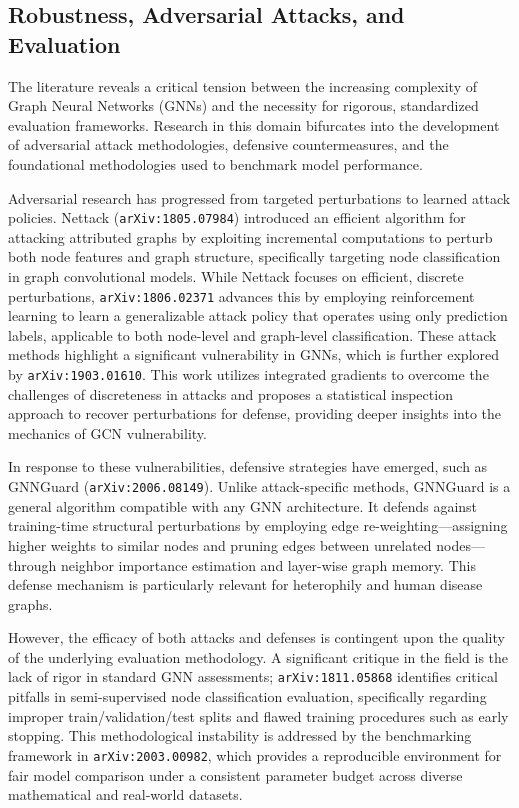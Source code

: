 \documentclass[11pt]{article}
\begin{document}
\subsection{Robustness, Adversarial Attacks, and Evaluation}

The literature reveals a critical tension between the increasing complexity of Graph Neural Networks (GNNs) and the necessity for rigorous, standardized evaluation frameworks. Research in this domain bifurcates into the development of adversarial attack methodologies, defensive countermeasures, and the foundational methodologies used to benchmark model performance.

Adversarial research has progressed from targeted perturbations to learned attack policies. Nettack (\texttt{arXiv:1805.07984}) introduced an efficient algorithm for attacking attributed graphs by exploiting incremental computations to perturb both node features and graph structure, specifically targeting node classification in graph convolutional models. While Nettack focuses on efficient, discrete perturbations, \texttt{arXiv:1806.02371} advances this by employing reinforcement learning to learn a generalizable attack policy that operates using only prediction labels, applicable to both node-level and graph-level classification. These attack methods highlight a significant vulnerability in GNNs, which is further explored by \texttt{arXiv:1903.01610}. This work utilizes integrated gradients to overcome the challenges of discreteness in attacks and proposes a statistical inspection approach to recover perturbations for defense, providing deeper insights into the mechanics of GCN vulnerability.

In response to these vulnerabilities, defensive strategies have emerged, such as GNNGuard (\texttt{arXiv:2006.08149}). Unlike attack-specific methods, GNNGuard is a general algorithm compatible with any GNN architecture. It defends against training-time structural perturbations by employing edge re-weighting—assigning higher weights to similar nodes and pruning edges between unrelated nodes—through neighbor importance estimation and layer-wise graph memory. This defense mechanism is particularly relevant for heterophily and human disease graphs.

However, the efficacy of both attacks and defenses is contingent upon the quality of the underlying evaluation methodology. A significant critique in the field is the lack of rigor in standard GNN assessments; \texttt{arXiv:1811.05868} identifies critical pitfalls in semi-supervised node classification evaluation, specifically regarding improper train/validation/test splits and flawed training procedures such as early stopping. This methodological instability is addressed by the benchmarking framework in \texttt{arXiv:2003.00982}, which provides a reproducible environment for fair model comparison under a consistent parameter budget across diverse mathematical and real-world datasets.
\end{document}
